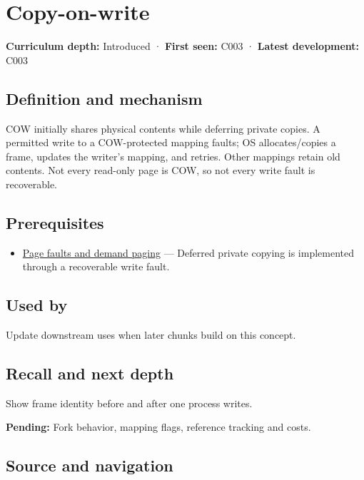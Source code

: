 \hypertarget{appendix-7a06e5baac04}{}
\section{Copy-on-write}\label{appendix-7a06e5baac04-copy-on-write}

\textbf{Curriculum depth:} Introduced · \textbf{First seen:} C003 · \textbf{Latest development:} C003

\subsection{Definition and mechanism}\label{appendix-7a06e5baac04-definition-and-mechanism}

COW initially shares physical contents while deferring private copies. A permitted write to a COW-protected mapping faults; OS allocates/copies a frame, updates the writer's mapping, and retries. Other mappings retain old contents. Not every read-only page is COW, so not every write fault is recoverable.

\subsection{Prerequisites}\label{appendix-7a06e5baac04-prerequisites}

\begin{itemize}
\tightlist
\item
  \hyperref[appendix-cc0909a7ef14]{Page faults and demand paging} --- Deferred private copying is implemented through a recoverable write fault.
\end{itemize}

\subsection{Used by}\label{appendix-7a06e5baac04-used-by}

Update downstream uses when later chunks build on this concept.

\subsection{Recall and next depth}\label{appendix-7a06e5baac04-recall-and-next-depth}

Show frame identity before and after one process writes.

\textbf{Pending:} Fork behavior, mapping flags, reference tracking and costs.

\subsection{Source and navigation}\label{appendix-7a06e5baac04-source-and-navigation}

